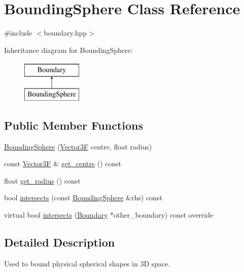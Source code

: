 \hypertarget{class_bounding_sphere}{}\section{Bounding\+Sphere Class Reference}
\label{class_bounding_sphere}


{\ttfamily \#include $<$boundary.\+hpp$>$}

Inheritance diagram for Bounding\+Sphere\+:\begin{figure}[H]
\begin{center}
\leavevmode
\includegraphics[height=2.000000cm]{class_bounding_sphere}
\end{center}
\end{figure}
\subsection*{Public Member Functions}
\begin{DoxyCompactItemize}
\item 
\mbox{\hyperlink{class_bounding_sphere_a9d6fd19a13a3ec6106254640591a26b8}{Bounding\+Sphere}} (\mbox{\hyperlink{class_vector3}{Vector3F}} centre, float radius)
\item 
const \mbox{\hyperlink{class_vector3}{Vector3F}} \& \mbox{\hyperlink{class_bounding_sphere_a8d81f5c646d752821c356742819ff512}{get\+\_\+centre}} () const
\item 
float \mbox{\hyperlink{class_bounding_sphere_a5049afba6967afbd35f3e18d82a51acd}{get\+\_\+radius}} () const
\item 
bool \mbox{\hyperlink{class_bounding_sphere_aea072dbeaec73a4738dd7adf496a11ae}{intersects}} (const \mbox{\hyperlink{class_bounding_sphere}{Bounding\+Sphere}} \&rhs) const
\item 
virtual bool \mbox{\hyperlink{class_bounding_sphere_aab64d759fac6a9835ac24d6fca8530d6}{intersects}} (\mbox{\hyperlink{class_boundary}{Boundary}} $\ast$other\+\_\+boundary) const override
\end{DoxyCompactItemize}


\subsection{Detailed Description}
Used to bound physical spherical shapes in 3D space. 

